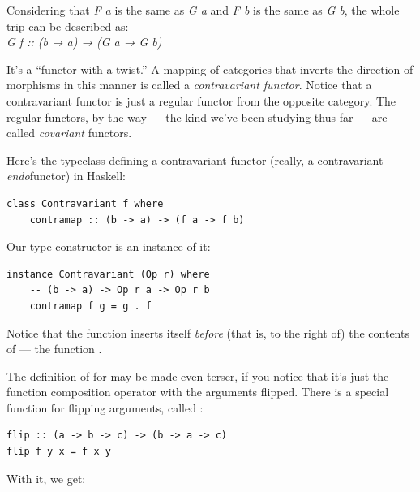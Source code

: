 Considering that \emph{F a} is the same as \emph{G a} and \emph{F b} is
the same as \emph{G b}, the whole trip can be described as:\\
\emph{G f :: (b → a) → (G a → G b)}

It's a ``functor with a twist.'' A mapping of categories that inverts
the direction of morphisms in this manner is called a
\emph{contravariant functor}. Notice that a contravariant functor is
just a regular functor from the opposite category. The regular functors,
by the way --- the kind we've been studying thus far --- are called
\emph{covariant} functors.

\begin{figure}[H]
\centering
{}
\end{figure}

\noindent
Here's the typeclass defining a contravariant functor (really, a
contravariant \emph{endo}functor) in Haskell:

\begin{Verbatim}
class Contravariant f where
    contramap :: (b -> a) -> (f a -> f b)
\end{Verbatim}
Our type constructor  is an instance of it:

\begin{Verbatim}
instance Contravariant (Op r) where
    -- (b -> a) -> Op r a -> Op r b
    contramap f g = g . f
\end{Verbatim}
Notice that the function  inserts itself \emph{before} (that
is, to the right of) the contents of  --- the function
.

The definition of  for  may be made even
terser, if you notice that it's just the function composition operator
with the arguments flipped. There is a special function for flipping
arguments, called :

\begin{Verbatim}[commandchars=\\\{\}]
flip :: (a -> b -> c) -> (b -> a -> c)
flip f y x = f x y
\end{Verbatim}
With it, we get:

